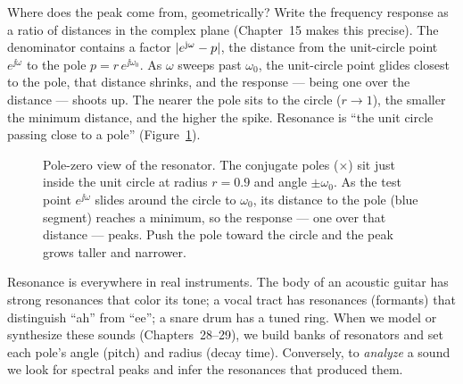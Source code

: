 \begin{whybox}
Where does the peak come from, geometrically? Write the frequency response as a
ratio of distances in the complex plane (Chapter~15 makes this precise). The
denominator contains a factor $\lvert e^{\mathrm{j}\omega} - p\rvert$, the distance from the
unit-circle point $e^{\jj\omega}$ to the pole $p = r\,e^{\jj\omega_0}$. As
$\omega$ sweeps past $\omega_0$, the unit-circle point glides closest to the
pole, that distance shrinks, and the response --- being one over the distance ---
shoots up. The nearer the pole sits to the circle ($r\to 1$), the smaller the
minimum distance, and the higher the spike. Resonance is ``the unit circle
passing close to a pole'' (Figure~\ref{ch14:fig-polezero}).
\end{whybox}

\begin{figure}[H]
\centering
{}
\caption{Pole-zero view of the resonator. The conjugate poles ($\times$) sit just
inside the unit circle at radius $r=0.9$ and angle $\pm\omega_0$. As the test
point $e^{\jj\omega}$ slides around the circle to $\omega_0$, its distance to the
pole (blue segment) reaches a minimum, so the response --- one over that distance
--- peaks. Push the pole toward the circle and the peak grows taller and
narrower.}
\label{ch14:fig-polezero}
\end{figure}

\begin{applicationbox}
Resonance is everywhere in real instruments. The body of an acoustic guitar has
strong resonances that color its tone; a vocal tract has resonances (formants)
that distinguish ``ah'' from ``ee''; a snare drum has a tuned ring. When we
model or synthesize these sounds (Chapters~28--29), we build banks of resonators
and set each pole's angle (pitch) and radius (decay time). Conversely, to
\emph{analyze} a sound we look for spectral peaks and infer the resonances that
produced them.
\end{applicationbox}


